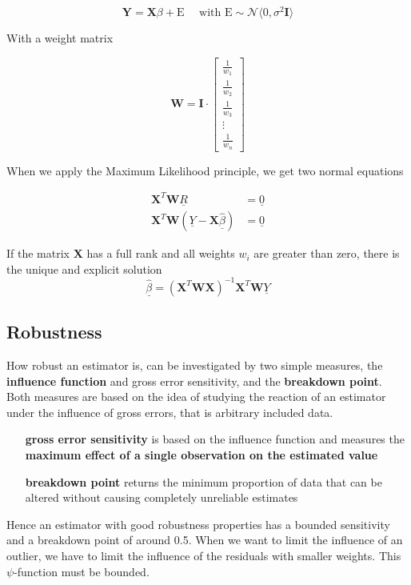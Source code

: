 \documentclass[11pt]{article}
\begin{document}
\begin{equation*}
	\textbf{Y} = \textbf{X}\beta + \text{E}\quad\text{ with }\text{E}\sim\mathcal{N}\langle 0, \sigma^2 \textbf{I}\rangle
\end{equation*}

\noindent
With a weight matrix

\begin{equation*}
	\textbf{W} = \textbf{I}\cdot \begin{bmatrix}
		\frac{1}{w_1}\\
		\frac{1}{w_2}\\
		\frac{1}{w_3}\\
		\vdots\\
		\frac{1}{w_n}
	\end{bmatrix}
\end{equation*}

\noindent
When we apply the Maximum Likelihood principle, we get two normal equations

\begin{align*}
	\textbf{X}^T \textbf{W}\underline{R} &= \underline{0}\\
	\textbf{X}^T \textbf{W}(\underline{Y}-\textbf{X}\underline{\widehat{\beta}}) &= \underline{0}
\end{align*}

\noindent
If the matrix $\textbf{X}$ has a full rank and all weights $w_i$ are greater than zero, there is the unique and explicit solution
\begin{equation*}
	\underline{\widehat{\beta}} = (\textbf{X}^T\textbf{W}\textbf{X})^{-1}\textbf{X}^T\textbf{W}\underline{Y}	
\end{equation*}

\subsection{Robustness}
How robust an estimator is, can be investigated by two simple measures, the \textbf{influence function} and gross error sensitivity, and the \textbf{breakdown point}.
Both measures are based on the idea of studying the reaction of an estimator under the influence of gross errors, that is arbitrary included data.

\begin{itemize}[leftmargin=*, labelindent=4cm, labelsep=0.5cm]
	\item[\textbf{gross error sensitivity}] is based on the influence function and measures the \textbf{maximum effect of a single observation on the estimated value}
	\item[\textbf{breakdown point}] returns the minimum proportion of data that can be altered without causing completely unreliable estimates
\end{itemize}
\noindent
Hence an estimator with good robustness properties has a bounded sensitivity and a breakdown point of around 0.5.
\noindent
When we want to limit the influence of an outlier, we have to limit the influence of the residuals with smaller weights. This $\psi$-function must be bounded.
\end{document}
